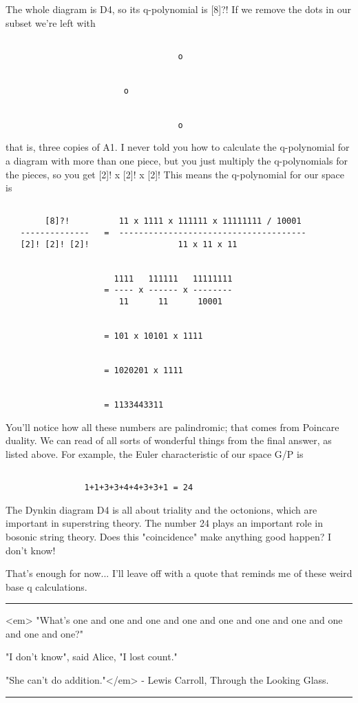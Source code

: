 The whole diagram is D4, so its q-polynomial is [8]?!   If we remove 
the dots in our subset we're left with 
  

\begin{verbatim}

                                   o 
                         

                        o
                         

                                   o
\end{verbatim}
    
that is, three copies of A1.  I never told you how to calculate the
q-polynomial for a diagram with more than one piece, but you just
multiply the q-polynomials for the pieces, so you get [2]! x [2]! x [2]!
This means the q-polynomial for our space is


\begin{verbatim}

        [8]?!          11 x 1111 x 111111 x 11111111 / 10001
   --------------   =  --------------------------------------
   [2]! [2]! [2]!                  11 x 11 x 11


                      1111   111111   11111111
                    = ---- x ------ x --------
                       11      11      10001


                    = 101 x 10101 x 1111


                    = 1020201 x 1111
 

                    = 1133443311
\end{verbatim}
    
You'll notice how all these numbers are palindromic; that comes from
Poincare duality.  We can read of all sorts of wonderful things from
the final answer, as listed above.  For example, the Euler characteristic 
of our space G/P is


\begin{verbatim}

                1+1+3+3+4+4+3+3+1 = 24
\end{verbatim}
    
The Dynkin diagram D4 is all about triality and the octonions, which are
important in superstring theory.  The number 24 plays an important role
in bosonic string theory.  Does this "coincidence" make
anything good happen?  I don't know!

That's enough for now... I'll leave off with a quote that reminds
me of these weird base q calculations.

\par\noindent\rule{\textwidth}{0.4pt}
<em>
"What's one and one and one and one and one and one and one and one
and one and one?"  

"I don't know", said Alice, "I lost count."  

"She can't do addition."</em> - Lewis Carroll, Through the Looking Glass.


\par\noindent\rule{\textwidth}{0.4pt}


